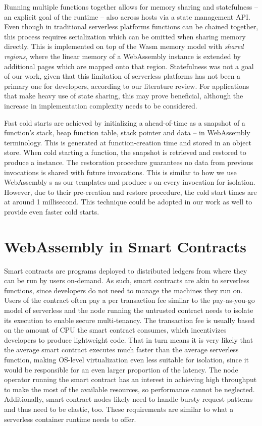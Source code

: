 Running multiple functions together allows for memory sharing and statefulness -- an explicit goal of the runtime --  also across hosts via a state management API. Even though in traditional serverless platforms functions can be chained together, this process requires serialization which can be omitted when sharing memory directly. This is implemented on top of the Wasm memory model with \emph{shared regions}, where the linear memory of a WebAssembly instance is extended by additional pages which are mapped onto that region.
Statefulness was not a goal of our work, given that this limitation of serverless platforms has not been a primary one for developers, according to our literature review. For applications that make heavy use of state sharing, this may prove beneficial, although the increase in implementation complexity needs to be considered.

Fast cold starts are achieved by initializing a  ahead-of-time as a snapshot of a function's stack, heap function table, stack pointer and data -- in WebAssembly terminology. This is generated at function-creation time and stored in an object store. When cold starting a function, the snapshot is retrieved and restored to produce a  instance. The restoration procedure guarantees no data from previous invocations is shared with future invocations. This is similar to how we use WebAssembly s as our templates and produce s on every invocation for isolation.
However, due to their pre-creation and restore procedure, the cold start times are at around 1 millisecond.
This technique could be adopted in our work as well to provide even faster cold starts.

\section{WebAssembly in Smart Contracts}

Smart contracts are programs deployed to distributed ledgers from where they can be run by users on-demand. As such, smart contracts are akin to serverless functions, since developers do not need to manage the machines they run on. Users of the contract often pay a per transaction fee similar to the pay-as-you-go model of serverless and the node running the untrusted contract needs to isolate its execution to enable secure multi-tenancy.
The transaction fee is usually based on the amount of CPU the smart contract consumes, which incentivizes developers to produce lightweight code. That in turn means it is very likely that the average smart contract executes much faster than the average serverless function, making OS-level virtualization even less suitable for isolation, since it would be responsible for an even larger proportion of the latency. The node operator running the smart contract has an interest in achieving high throughput to make the most of the available resources, so performance cannot be neglected. Additionally, smart contract nodes likely need to handle bursty request patterns and thus need to be elastic, too.
These requirements are similar to what a serverless container runtime needs to offer.

